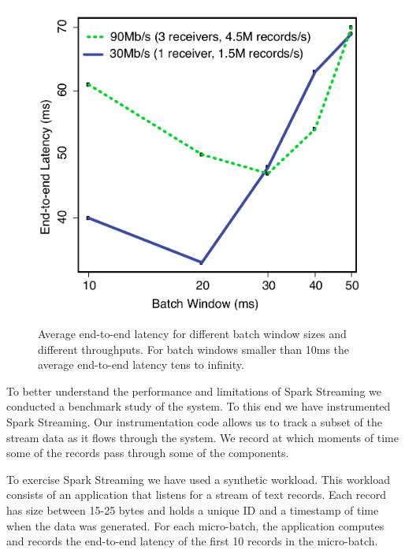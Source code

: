 \begin{figure}[t!]
  \begin{center}
    \includegraphics[scale=0.50]{images_graphs/batchsize_vs_latency/batchsize_vs_latency_illustrator.pdf}
  \end{center}
  \caption{Average end-to-end latency for different batch window sizes and different throughputs. For batch windows smaller than 10ms the average end-to-end latency tens to infinity.}
  \label{fig:Batchsize_vs_latency}
\end{figure}


To better understand the performance and limitations of Spark Streaming we conducted a benchmark study of the system.
To this end we have instrumented Spark Streaming.
Our instrumentation code allows us to track a subset of the stream data as it flows through the system.
We record at which moments of time some of the records pass through some of the components.

To exercise Spark Streaming we have used a synthetic workload.
This workload consists of an application that listens for a stream of text records.
Each record has size between 15-25 bytes and holds a unique ID and a timestamp of time when the data was generated.
For each micro-batch, the application computes and records the end-to-end latency of the first 10 records in the micro-batch.

